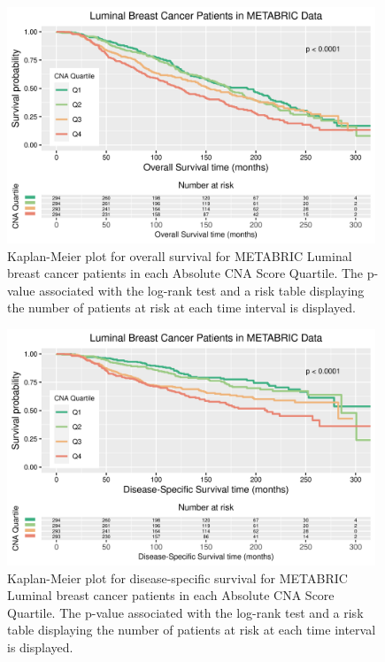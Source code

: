 \begin{figure}[!h]
\centering
\includegraphics[width=0.98\textwidth]{../figures/Chapter_3/Luminal_AB_Score_OS.png}
\caption[Kaplan-Meier plot for overall survival for METABRIC Luminal breast cancer patients in each Absolute CNA Score Quartile.]{Kaplan-Meier plot for overall survival for METABRIC Luminal breast cancer patients in each Absolute CNA Score Quartile. The p-value associated with the log-rank test and a risk table displaying the number of patients at risk at each time interval is displayed.}
\label{fig:OS-Survival-Luminal}
\end{figure}


\begin{figure}[!h]
\centering
\includegraphics[width=0.98\textwidth]{../figures/Chapter_3/Luminal_AB_Score_DSS.png}
\caption[Kaplan-Meier plot for disease-specific survival for METABRIC Luminal breast cancer patients in each Absolute CNA Score Quartile.]{Kaplan-Meier plot for disease-specific survival for METABRIC Luminal breast cancer patients in each Absolute CNA Score Quartile. The p-value associated with the log-rank test and a risk table displaying the number of patients at risk at each time interval is displayed.}
\label{fig:DSS-Survival-Luminal}
\end{figure}

